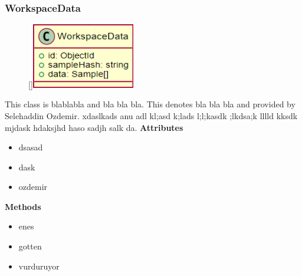 \subsubsection{WorkspaceData}
\begin{figure}
    \raisebox{0pt}[\dimexpr{}\baselineskip\relax]{\includegraphics[width=4.5cm]{classes/model-management/14.png}}
\end{figure} 
\par
This class is blablabla and bla bla bla. This denotes bla bla bla and provided by Selehaddin Ozdemir. xdaslkads anu adl kl;asd k;lads l;l;kasdk ;lkdsa;k lllld kksdk mjdask hdaksjhd haso sadjh salk da.
\newline
\newline
\textbf{Attributes}
\begin{itemize}
    \item dsasad
    \item dask
    \item ozdemir
\end{itemize}
\textbf{Methods}
\begin{itemize}
    \item enes
    \item gotten
    \item vurduruyor
\end{itemize}

